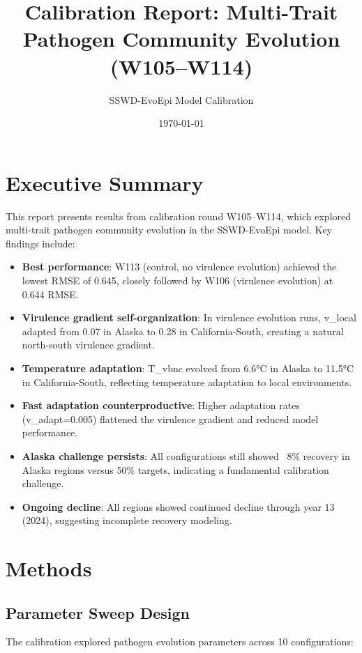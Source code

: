 \documentclass[11pt,a4paper]{article}
\title{Calibration Report: Multi-Trait Pathogen Community Evolution (W105–W114)}
\author{SSWD-EvoEpi Model Calibration}
\date{\today}
\begin{document}
\maketitle

\section{Executive Summary}

This report presents results from calibration round W105–W114, which explored multi-trait pathogen community evolution in the SSWD-EvoEpi model. Key findings include:

\begin{itemize}
\item \textbf{Best performance}: W113 (control, no virulence evolution) achieved the lowest RMSE of 0.645, closely followed by W106 (virulence evolution) at 0.644 RMSE.
\item \textbf{Virulence gradient self-organization}: In virulence evolution runs, v\_local adapted from 0.07 in Alaska to 0.28 in California-South, creating a natural north-south virulence gradient.
\item \textbf{Temperature adaptation}: T\_vbnc evolved from 6.6°C in Alaska to 11.5°C in California-South, reflecting temperature adaptation to local environments.
\item \textbf{Fast adaptation counterproductive}: Higher adaptation rates (v\_adapt=0.005) flattened the virulence gradient and reduced model performance.
\item \textbf{Alaska challenge persists}: All configurations still showed ~8\% recovery in Alaska regions versus 50\% targets, indicating a fundamental calibration challenge.
\item \textbf{Ongoing decline}: All regions showed continued decline through year 13 (2024), suggesting incomplete recovery modeling.
\end{itemize}

\section{Methods}

\subsection{Parameter Sweep Design}

The calibration explored pathogen evolution parameters across 10 configurations:
\end{document}
